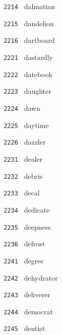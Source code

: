 \documentclass[11pt]{article}
\begin{document}
\begin{multicols}{6}
\noindent \texttt{ 2214 } \hspace{1mm} dalmatian  \par
\noindent \texttt{ 2215 } \hspace{1mm} dandelion  \par
\noindent \texttt{ 2216 } \hspace{1mm} dartboard  \par
\noindent \texttt{ 2221 } \hspace{1mm} dastardly  \par
\noindent \texttt{ 2222 } \hspace{1mm} datebook  \par
\noindent \texttt{ 2223 } \hspace{1mm} daughter  \par
\noindent \texttt{ 2224 } \hspace{1mm} dawn  \par
\noindent \texttt{ 2225 } \hspace{1mm} daytime  \par
\noindent \texttt{ 2226 } \hspace{1mm} dazzler  \par
\noindent \texttt{ 2231 } \hspace{1mm} dealer  \par
\noindent \texttt{ 2232 } \hspace{1mm} debris  \par
\noindent \texttt{ 2233 } \hspace{1mm} decal  \par
\noindent \texttt{ 2234 } \hspace{1mm} dedicate  \par
\noindent \texttt{ 2235 } \hspace{1mm} deepness  \par
\noindent \texttt{ 2236 } \hspace{1mm} defrost  \par
\noindent \texttt{ 2241 } \hspace{1mm} degree  \par
\noindent \texttt{ 2242 } \hspace{1mm} dehydrator  \par
\noindent \texttt{ 2243 } \hspace{1mm} deliverer  \par
\noindent \texttt{ 2244 } \hspace{1mm} democrat  \par
\noindent \texttt{ 2245 } \hspace{1mm} dentist  \par

\end{multicols}
\end{document}
